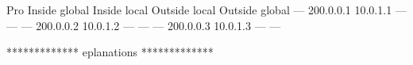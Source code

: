 Pro Inside global      Inside local       Outside local      Outside global
--- 200.0.0.1          10.0.1.1           ---                ---
--- 200.0.0.2          10.0.1.2           ---                ---
--- 200.0.0.3          10.0.1.3           ---                ---

************* eplanations ************* 